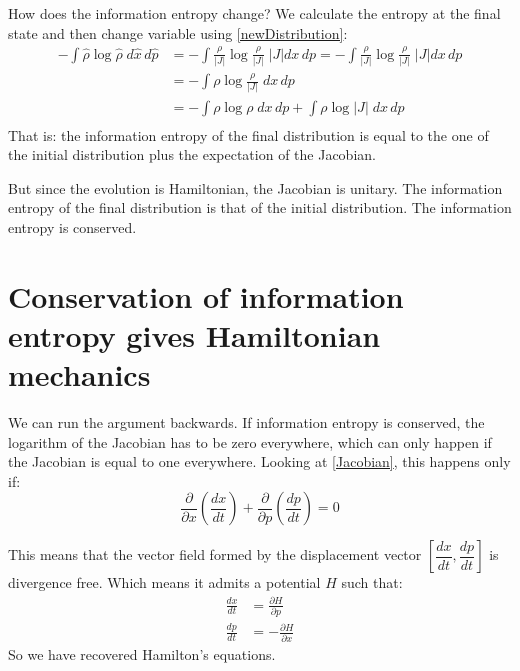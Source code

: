 \documentclass[aps,pra,10pt,floatfix,nofootinbib]{revtex4-1}
\theoremstyle{definition}
\begin{document}
How does the information entropy change? We calculate the entropy at the final state and then change variable using \eqref{newDistribution}:
\begin{equation}
\begin{aligned}
-\int \hat{\rho} \log \hat{\rho} \; d\hat{x}\,d\hat{p}&= -\int \frac{\rho}{|J|} \log \frac{\rho}{|J|} \; |J| dx \,dp = -\int \frac{\rho}{|J|} \log \frac{\rho}{|J|} \; |J| dx \,dp \\
&= -\int \rho \log \frac{\rho}{|J|} \; dx \,dp \\
&= -\int \rho \log \rho \; dx \,dp + \int \rho \log |J| \; dx \,dp \\
\end{aligned}
\label{newEntropy}
\end{equation}
That is: the information entropy of the final distribution is equal to the one of the initial distribution plus the expectation of the Jacobian.

But since the evolution is Hamiltonian, the Jacobian is unitary. The information entropy of the final distribution is that of the initial distribution. The information entropy is conserved.

\section{Conservation of information entropy gives Hamiltonian mechanics}

We can run the argument backwards. If information entropy is conserved, the logarithm of the Jacobian has to be zero everywhere, which can only happen if the Jacobian is equal to one everywhere. Looking at \eqref{Jacobian}, this happens only if:
\begin{equation}
\dfrac{\partial}{\partial x} \left( \dfrac{dx}{dt} \right) + \dfrac{\partial}{\partial p} \left( \dfrac{dp}{dt} \right) = 0
\label{Jacobian}
\end{equation}

This means that the vector field formed by the displacement vector $\left[ \dfrac{dx}{dt}, \dfrac{dp}{dt}\right]$ is divergence free. Which means it admits a potential $H$ such that:
\begin{equation}
\begin{aligned}
\frac{dx}{dt} &= \frac{\partial H}{\partial p}  \\
\frac{dp}{dt} &= - \frac{\partial H}{\partial x}
\end{aligned}
\label{Hamilton}
\end{equation}
So we have recovered Hamilton's equations.
\end{document}
